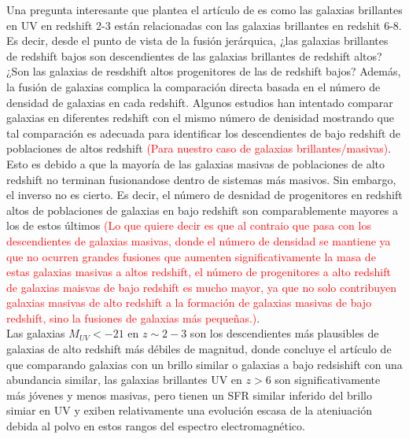 \documentclass{article}
\begin{document}
Una pregunta interesante que plantea el artículo de \cite{finkelstein2015increasing} es como las galaxias brillantes en UV en redshift 2-3 están relacionadas con las galaxias brillantes en redshit 6-8. Es decir, desde el punto de vista de la fusión jerárquica, ¿las galaxias brillantes de redshift bajos son descendientes de las galaxias brillantes de redshift altos? ¿Son las galaxias de resdshift altos progenitores de las de redshift bajos? Además, la fusión de galaxias complica la comparación directa basada en el número de densidad de galaxias en cada redshift. Algunos estudios han intentado comparar galaxias en diferentes redshift con el mismo número de denisidad mostrando que tal comparación es adecuada para identificar los descendientes de bajo redshift de poblaciones de altos redshift \textcolor{red}{(Para nuestro caso de galaxias brillantes/masivas)}. Esto es debido a que la mayoría de las galaxias masivas de poblaciones de alto redshift no terminan fusionandose dentro de sistemas más masivos. Sin embargo, el inverso no es cierto. Es decir, el número de desnidad de progenitores en redshift altos de poblaciones de galaxias en bajo redshift son comparablemente mayores a los de estos últimos \textcolor{red}{(Lo que quiere decir es que al contraio que pasa con los descendientes de galaxias masivas, donde el número de densidad se mantiene ya que no ocurren grandes fusiones que aumenten significativamente la masa de estas galaxias masivas a altos redshift, el número de progenitores a alto redshift de galaxias maisvas de bajo redshift es mucho mayor, ya que no solo contribuyen galaxias masivas de alto redshift a la formación de galaxias masivas de bajo redshift, sino la fusiones de galaxias más pequeñas.)}.\\


Las galaxias $M_{UV}<-21$ en $z\sim 2-3$ son los descendientes más plausibles de galaxias de alto redshift más débiles de magnitud, donde concluye el artículo de \cite{finkelstein2015increasing} que comparando galaxias con un brillo similar o galaxias a bajo redsishift con una abundancia similar, las galaxias brillantes UV en $z>6$ son significativamente más jóvenes y menos masivas, pero tienen un SFR similar inferido del brillo simiar en UV y exiben relativamente una evolución escasa de la ateniuación debida al polvo en estos rangos del espectro electromagnético.\\
\end{document}
